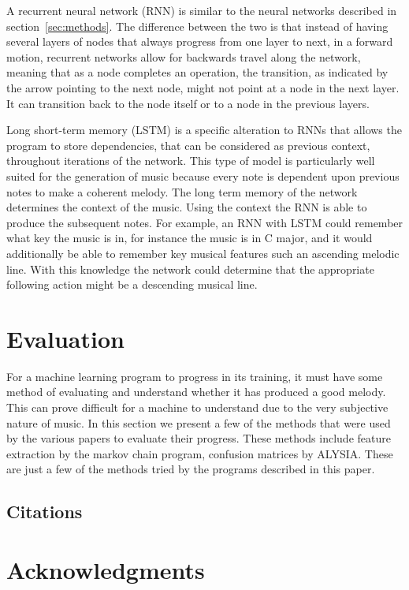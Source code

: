\documentclass{sig-alternate}
\begin{document}
	 A recurrent neural network (RNN) is similar to the neural networks described in section~\ref{sec:methods}. The difference between the two is that instead of having several layers of nodes that always progress from one layer to next, in a forward motion, recurrent networks allow for backwards travel along the network, meaning that as a node completes an operation, the transition, as indicated by the arrow pointing to the next node, might not point at a node in the next layer. It can transition back to the node itself or to a node in the previous layers.
	
	Long short-term memory (LSTM) is a specific alteration to RNNs that allows the program to store dependencies, that can be considered as previous context, throughout iterations of the network. This type of model is particularly well suited for the generation of music because every note is dependent upon previous notes to make a coherent melody. The long term memory of the network determines the context of the music. Using the context the RNN is able to produce the subsequent notes. For example, an RNN with LSTM could remember what key the music is in, for instance the music is in C major, and it would additionally be able to remember key musical features such an ascending melodic line. With this knowledge the network could determine that the appropriate following action might be a descending musical line.


\section{Evaluation}
\label{sec:evaluation}

For a machine learning program to progress in its training, it must have some method of evaluating and understand whether it has produced a good melody. This can prove difficult for a machine to understand due to the very subjective nature of music. In this section we present a few of the methods that were used by the various papers to evaluate their progress. These methods include feature extraction by the markov chain program, confusion matrices by ALYSIA. These are just a few of the methods tried by the programs described in this paper.
	
	


\subsection{Citations}
\label{sec:citations}

\section*{Acknowledgments}
\label{sec:acknowledgments}









  
\end{document}
